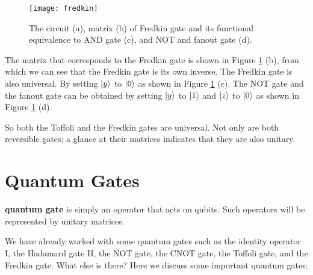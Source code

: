\documentclass{easyclass}
\begin{document}
\begin{figure}[h]
	\centering
	\texttt{[image: fredkin]}
	\caption{The circuit (a), matrix (b) of Fredkin gate and its functional equivalence to AND gate (c), and NOT and fanout gate (d).}
	\label{fig:fredkin}
\end{figure}

The matrix that corresponds to the Fredkin gate is shown in Figure \ref{fig:fredkin} (b), from which we can see that the Fredkin gate is its own inverse. The Fredkin gate is also universal. By setting $\ket{y}$ to $\ket{0}$ as shown in Figure \ref{fig:fredkin} (c). The NOT gate and the fanout gate can be obtained by setting $\ket{y}$ to $\ket{1}$ and $\ket{z}$ to $\ket{0}$ as shown in Figure \ref{fig:fredkin} (d). 

So both the Toffoli and the Fredkin gates are universal. Not only are both reversible gates; a glance at their matrices indicates that they are also unitary. 


\section{Quantum Gates}
\textbf{quantum gate} is simply an operator that acts on qubits. Such
operators will be represented by unitary matrices.

We have already worked with some quantum gates such as the identity operator I, the Hadamard gate H, the NOT gate, the CNOT gate, the Toffoli gate, and the Fredkin gate. What else is there? Here we discuss some important quantum gates:
\end{document}
